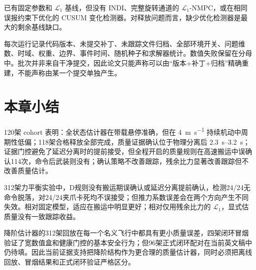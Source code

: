 \documentclass[11pt,UTF8,fontset=none]{ctexrep}
\begin{document}
已有固定参数和 $\mathcal L_1$ 基线，但没有 INDI、完整旋转通道的 $\mathcal L_1$-NMPC，或在相同误报约束下优化的 CUSUM 变化检测器。对释放问题而言，缺少优化检测器是最大的剩余基线缺口。

每次运行记录代码版本、未提交补丁、未跟踪文件归档、全部环境开关、问题维数、时域、权重、边界、事件时间、随机种子和求解器统计。数值失败保留在分母中。批次并非来自干净提交，因此论文只能声称可以由“版本+补丁+归档”精确重建，不能声称由某一个提交单独产生。

\section{本章小结}

120架 cohort 表明：全状态估计器在带载悬停准确，但在 \SI{4}{\meter\per\second} 持续机动中周期性低偏；118架合格释放全部完成，质量证据确认位于物理分离后 \SIrange{2.3}{3.2}{\second}；证据门控避免了延迟分离时的提前接受，但全程开启的质量规则在高速搬运中误确认114次，命令后武装则没有；确认策略不改善跟踪，残余比力显著改善跟踪但不改善质量估计。

312架力平衡实验中，D规则没有搬运期误确认或延迟分离提前确认，检测24/24无命令脱落，对24/24夹爪卡死均不误接受；但推力系数误差会在两个方向产生不同失效。相对固定模型，适应在搬运中明显更好；相对仅用残余比力的 $\mathcal L_1$，显式估质量没有一致跟踪收益。

降阶估计器的312架回放在每一个名义飞行中都具有更小质量误差，四架闭环冒烟验证了宽数值盒和健康门控的基本安全行为；但96架正式闭环配对在当前英文稿中仍待填。因此当前证据支持把降阶结构作为更合理的质量估计器，同时必须把离线回放、冒烟结果和正式闭环验证严格区分。
\end{document}
